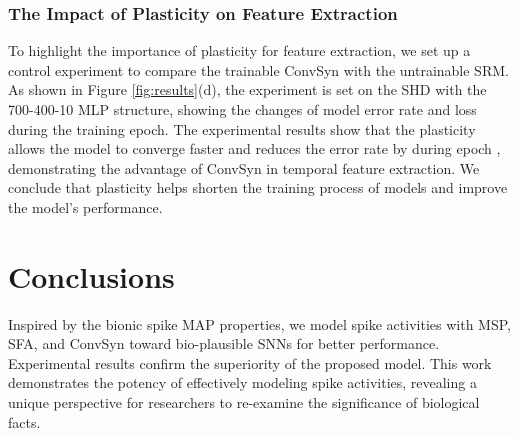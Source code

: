 \documentclass{article}
\begin{document}
\subsubsection{The Impact of Plasticity on Feature Extraction}
To highlight the importance of plasticity for feature extraction, we set up a control experiment to compare the trainable ConvSyn with the untrainable SRM. As shown in Figure \ref{fig:results}(d), the experiment is set on the SHD with the 700-400-10 MLP structure, showing the changes of model error rate and loss during the training epoch. The experimental results show that the plasticity allows the model to converge faster and reduces the error rate by  during epoch , demonstrating the advantage of ConvSyn in temporal feature extraction. We conclude that plasticity helps shorten the training process of models and improve the model's performance.


\section{Conclusions}
Inspired by the bionic spike MAP properties, we model spike activities with MSP, SFA, and ConvSyn toward bio-plausible SNNs for better performance. Experimental results confirm the superiority of the proposed model. This work demonstrates the potency of effectively modeling spike activities, revealing a unique perspective for researchers to re-examine the significance of biological facts.

\newpage


\end{document}
